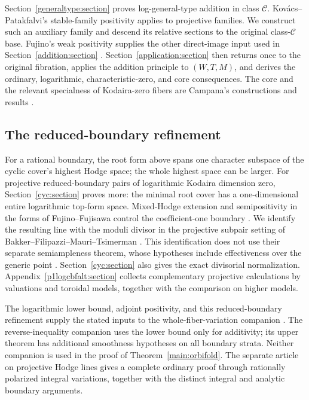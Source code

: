 Section~\ref{generaltype:section} proves log-general-type addition in class $\mathcal C$.
Kov\'acs--Patakfalvi's stable-family positivity applies to projective
families. We construct such an auxiliary family and descend its
relative sections to the original class-$\mathcal C$ base.
Fujino's weak positivity supplies the other direct-image input
used in Section~\ref{addition:section} \cite{KovacsPatakfalvi,FujinoWeakPositivity}.
Section~\ref{application:section} then returns once to the original fibration, applies the
addition principle to $(W,T,M)$, and derives the ordinary,
logarithmic, characteristic-zero, and core consequences. The core
and the relevant specialness of Kodaira-zero fibers are Campana's
constructions and results \cite{Campana2004,CampanaOrbifolds}.

\subsection{The reduced-boundary refinement}

For a rational boundary, the root form above spans one character
subspace of the cyclic cover's highest Hodge space; the whole
highest space can be larger. For projective reduced-boundary pairs
of logarithmic Kodaira dimension zero, Section~\ref{cyc:section} proves more:
the minimal root cover has a one-dimensional entire logarithmic
top-form space. Mixed-Hodge extension and semipositivity in the
forms of Fujino--Fujisawa control the coefficient-one boundary
\cite{FujinoFujisawa,FujinoFujisawaVMHS}.
We identify the resulting line with the moduli divisor in the
projective subpair setting of Bakker--Filipazzi--Mauri--Tsimerman
\cite[Theorem~6.28]{BFMT}. This identification does not use their
separate semiampleness theorem, whose hypotheses include
effectiveness over the generic point \cite[Theorem~1.5]{BFMT}.
Section~\ref{cyc:section} also gives the exact divisorial normalization.
Appendix~\ref{p1logcbfalt:section} collects complementary projective
calculations by valuations and toroidal models, together with the
comparison on higher models.

The logarithmic lower bound, adjoint positivity, and this
reduced-boundary refinement supply the stated inputs to the
whole-fiber-variation companion \cite{IitakaVariationCompanion}. The reverse-inequality companion
\cite{IitakaAdditivityCompanion} uses the lower bound only for additivity; its upper theorem has
additional smoothness hypotheses on all boundary strata.
Neither companion is used in the proof of Theorem~\ref{main:orbifold}.
The separate article on projective Hodge lines
\cite{IitakaProjectiveCompanion} gives a complete
ordinary proof through rationally polarized integral variations,
together with the distinct integral and analytic boundary arguments.
